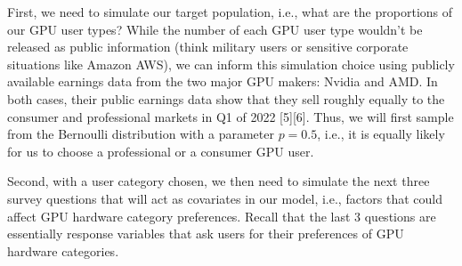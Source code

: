 \documentclass[
]{article}
\begin{document}
First, we need to simulate our target population, i.e., what are the
proportions of our GPU user types? While the number of each GPU user
type wouldn't be released as public information (think military users or
sensitive corporate situations like Amazon AWS), we can inform this
simulation choice using publicly available earnings data from the two
major GPU makers: Nvidia and AMD. In both cases, their public earnings
data show that they sell roughly equally to the consumer and
professional markets in Q1 of 2022 {[}5{]}{[}6{]}. Thus, we will first
sample from the Bernoulli distribution with a parameter \(p=0.5\), i.e.,
it is equally likely for us to choose a professional or a consumer GPU
user.

Second, with a user category chosen, we then need to simulate the next
three survey questions that will act as covariates in our model, i.e.,
factors that could affect GPU hardware category preferences. Recall that
the last 3 questions are essentially response variables that ask users
for their preferences of GPU hardware categories.
\end{document}
